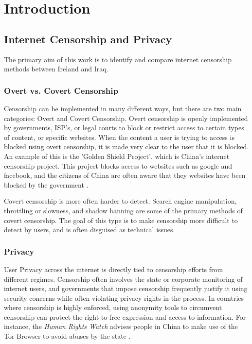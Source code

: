 \chapter{Introduction}

\section{Internet Censorship and Privacy}

The primary aim of this work is to identify and compare internet censorship methods between Ireland and Iraq. 

\subsection{Overt vs. Covert Censorship}

Censorship can be implemented in many different ways, but there are two main categories: Overt and Covert Censorship. Overt censorship is openly implemented by governments, ISP's, or legal courts to block or restrict access to certain types of content, or specific websites. When the content a user is trying to access is blocked using overt censorship, it is made very clear to the user that it is blocked. An example of this is the 'Golden Shield Project', which is China's internet censorship project. This project blocks access to websites such as google and facebook, and the citizens of China are often aware that they websites have been blocked by the government \cite{standfordGreatFirewallOfChina}.

Covert censorship is more often harder to detect. Search engine manipulation, throttling or slowness, and shadow banning are some of the primary methods of covert censorship. The goal of this type is to make censorship more difficult to detect by users, and is often disguised as technical issues. 

\subsection{Privacy}

User Privacy across the internet is directly tied to censorship efforts from different regimes. Censorship often involves the state or corporate monitoring of internet users, and governments that impose censorship frequently justify it using security concerns while often violating privacy rights in the process. In countries where censorship is highly enforced, using anonymity tools to circumvent censorship can protect the right to free expression and access to information. For instance, the \textit{Human Rights Watch} advises people in China to make use of the Tor Browser to avoid abuses by the state \cite{Privacy2017}. 

